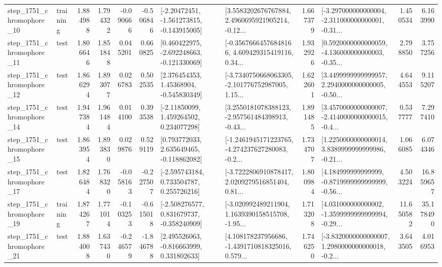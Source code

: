 \begin{tabular}{llrrrrllrlrr}
 step\_1751\_chromophore\_10 &  training &      1.884988 &    1.794322 &     -0.090666 & -0.506846 &   [-2.20472451, -1.561273815, -0.143915005] &  [3.5583202676767884, 2.4960695921905214, -0.12... &       1.667379 &  [-3.297000000000004, -2.311000000000001, -0.31... &            1.450534 &          6.163990 \\
 step\_1751\_chromophore\_11 &      test &      1.806646 &    1.851848 &      0.045201 &  0.660825 &   [0.460422975, -2.692248663, -0.121330069] &  [-0.35676664576848166, 4.609429315419116, 0.34... &       1.932926 &  [0.5920000000000059, -4.136000000000003, -0.35... &            2.798850 &          3.757256 \\
 step\_1751\_chromophore\_12 &      test &      1.866294 &    1.893077 &      0.026783 &  0.502535 &     [2.376454353, 1.45368904, -0.545830349] &  [-3.7340750668063305, -2.101776752987005, 1.15... &       1.622601 &  [3.4499999999999957, 2.2940000000000005, -0.50... &            4.644553 &          9.115207 \\
 step\_1751\_chromophore\_14 &      test &      1.947384 &    1.961484 &      0.014100 &  0.393538 &     [-2.11850099, 1.459264502, 0.234077298] &  [3.2550181078388123, -2.957561484398913, -0.43... &       1.891485 &  [3.4570000000000007, -2.4140000000000015, -0.4... &            0.537777 &          7.297410 \\
 step\_1751\_chromophore\_15 &      test &      1.863954 &    1.893830 &      0.029876 &  0.529119 &    [0.793772033, 2.635649465, -0.118862082] &  [-1.2461945171223765, -4.274237627280083, -0.2... &       1.734707 &  [1.2250000000000014, 3.8389999999999986, -0.21... &            1.066085 &          6.074346 \\
 step\_1751\_chromophore\_17 &      test &      1.826484 &    1.768320 &     -0.058163 & -0.227507 &    [-2.595743184, 0.733504787, 0.255726216] &  [-3.7222806910878417, 2.0209279516851404, 0.81... &       1.800984 &  [4.184999999999999, -0.8719999999999999, -0.56... &            4.503224 &         16.859657 \\
 step\_1751\_chromophore\_19 &  training &      1.874267 &    1.771014 &     -0.103253 & -0.615018 &   [-2.508276577, 0.831679737, -0.358240909] &  [-3.020992489211904, 1.1639390158515708, -1.95... &       1.713208 &  [4.031000000000002, -1.3599999999999994, -0.29... &           11.650582 &         35.178490 \\
 step\_1751\_chromophore\_21 &      test &      1.884008 &    1.637430 &     -0.246579 & -1.846788 &    [2.495526063, -0.816663999, 0.331802633] &  [4.108178237956686, -1.4391710818325016, 0.579... &       1.746250 &  [-3.8320000000000007, 1.2980000000000018, -0.2... &            3.643505 &          4.016953 \\

\end{tabular}
